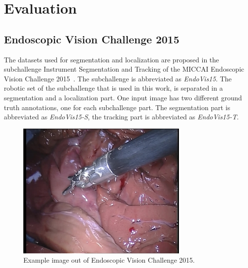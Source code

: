 \documentclass[conference]{IEEEtran}
\begin{document}
\section{Evaluation}
\subsection{Endoscopic Vision Challenge 2015}
The datasets used for segmentation and localization are proposed in the subchallenge Instrument Segmentation and Tracking of the MICCAI Endoscopic Vision Challenge 2015~\cite{EndoVis15}. The subchallenge is abbreviated as \emph{EndoVis15}.
The robotic set of the subchallenge that is used in this work, is separated in a segmentation and a localization part.
One input image has two different ground truth annotations, one for each subchallenge part.
The segmentation part is abbreviated as \emph{EndoVis15-S}, the tracking part is abbreviated as \emph{EndoVis15-T}. %

\begin{figure}%
\centering
\includegraphics[width=0.6\linewidth]{../images/dataset/robotic15_segm/image_frame001-1instrument.jpg}
\caption{Example image out of Endoscopic Vision Challenge 2015.}
\label{img:endo_vis15_example_frame_orig}
\end{figure}
\end{document}
